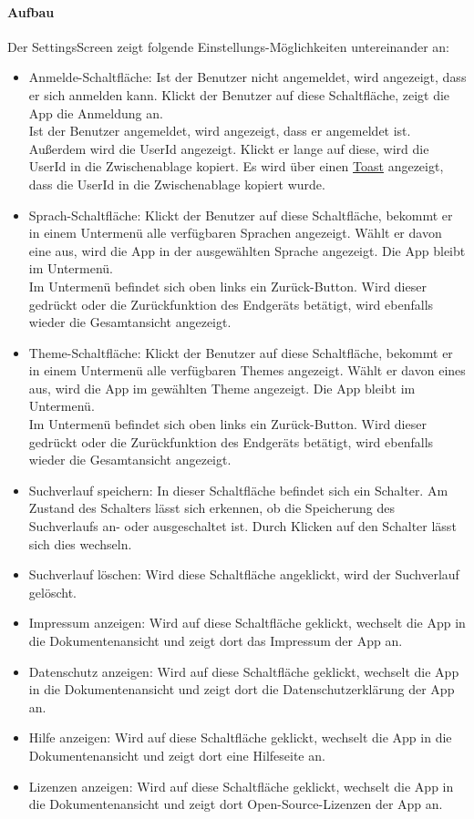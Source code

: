 \paragraph*{Aufbau}
Der SettingsScreen zeigt folgende Einstellungs-Möglichkeiten untereinander an:
\begin{itemize}
    \item Anmelde-Schaltfläche: Ist der Benutzer nicht angemeldet, wird angezeigt, dass er sich anmelden kann. 
    Klickt der Benutzer auf diese Schaltfläche, zeigt die App die Anmeldung an.\\
    Ist der Benutzer angemeldet, wird angezeigt, dass er angemeldet ist. Außerdem wird die UserId angezeigt. 
    Klickt er lange auf diese, wird die UserId in die Zwischenablage kopiert. 
    Es wird über einen \href{https://developer.android.com/guide/topics/ui/notifiers/toasts}{Toast} angezeigt, dass 
    die UserId in die Zwischenablage kopiert wurde.
    \item Sprach-Schaltfläche: Klickt der Benutzer auf diese Schaltfläche, bekommt er in einem Untermenü alle verfügbaren Sprachen angezeigt. 
    Wählt er davon eine aus, wird die App in der ausgewählten Sprache angezeigt. Die App bleibt im Untermenü.\\
    Im Untermenü befindet sich oben links ein Zurück-Button. Wird dieser gedrückt oder die Zurückfunktion des Endgeräts betätigt, 
    wird ebenfalls wieder die Gesamtansicht angezeigt.
    \item Theme-Schaltfläche: Klickt der Benutzer auf diese Schaltfläche, bekommt er in einem Untermenü alle verfügbaren Themes angezeigt. 
    Wählt er davon eines aus, wird die App im gewählten Theme angezeigt. Die App bleibt im Untermenü.\\
    Im Untermenü befindet sich oben links ein Zurück-Button. Wird dieser gedrückt oder die Zurückfunktion des Endgeräts betätigt, 
    wird ebenfalls wieder die Gesamtansicht angezeigt.
    \item Suchverlauf speichern: In dieser Schaltfläche befindet sich ein Schalter. 
    Am Zustand des Schalters lässt sich erkennen, ob die Speicherung des Suchverlaufs an- oder ausgeschaltet ist. 
    Durch Klicken auf den Schalter lässt sich dies wechseln.
    \item Suchverlauf löschen: Wird diese Schaltfläche angeklickt, wird der Suchverlauf gelöscht.
    \item Impressum anzeigen: Wird auf diese Schaltfläche geklickt, wechselt die App in die Dokumentenansicht und zeigt dort das Impressum der App an.
    \item Datenschutz anzeigen: Wird auf diese Schaltfläche geklickt, wechselt die App in die Dokumentenansicht und zeigt dort die Datenschutzerklärung der App an.
    \item Hilfe anzeigen: Wird auf diese Schaltfläche geklickt, wechselt die App in die Dokumentenansicht und zeigt dort eine Hilfeseite an.
    \item Lizenzen anzeigen: Wird auf diese Schaltfläche geklickt, wechselt die App in die Dokumentenansicht und zeigt dort Open-Source-Lizenzen der App an.
\end{itemize}